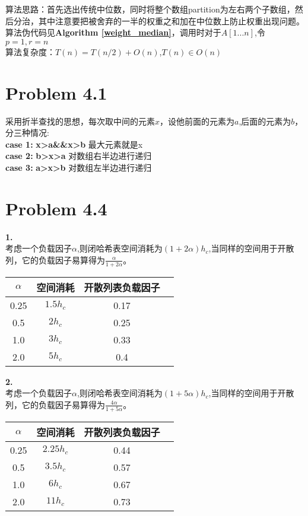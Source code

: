 \documentclass[twocolumn]{ctexart}
\begin{document}
\indent 算法思路：首先选出传统中位数，同时将整个数组partition为左右两个子数组，然后分治，其中注意要把被舍弃的一半的权重之和加在中位数上防止权重出现问题。算法伪代码见\textbf{Algorithm \ref{weight_median}}，调用时对于$A[1...n]$,令$p=1,r=n$\\
\indent 算法复杂度：$T(n)=T(n/2)+O(n)$,$T(n)\in O(n)$\\


\section*{Problem 4.1}
\indent 采用折半查找的思想，每次取中间的元素$x$，设他前面的元素为$a$,后面的元素为$b$，分三种情况:\\
\indent \textbf{case 1:} \textbf{x>a\&\&x>b} 最大元素就是x\\
\indent \textbf{case 2:} \textbf{b>x>a}		对数组右半边进行递归\\
\indent \textbf{case 3:} \textbf{a>x>b}		对数组左半边进行递归

\section*{Problem 4.4}
\noindent \textbf{1.}\\
\indent 考虑一个负载因子$\alpha$,则闭哈希表空间消耗为$(1+2\alpha)h_c$,当同样的空间用于开散列，它的负载因子易算得为$\frac{\alpha}{1+2\alpha}$。\\
\begin{table}[!h]
	\centering
	\begin{tabular}{cccc}
		\toprule
		$\alpha$ &空间消耗& 开散列表负载因子\\
		\midrule
		0.25	&$1.5h_c$	& 	0.17\\		
		0.5		&$2h_c$ 	&	0.25\\
		1.0		&$3h_c$ 	&	0.33\\
		2.0		&$5h_c$ 	&	0.4\\
		\bottomrule
	\end{tabular}
\end{table}

\noindent \textbf{2.}\\
\indent 
考虑一个负载因子$\alpha$,则闭哈希表空间消耗为$(1+5\alpha)h_c$,当同样的空间用于开散列，它的负载因子易算得为$\frac{4\alpha}{1+5\alpha}$。\\
\begin{table}[!h]
	\centering
	\begin{tabular}{cccc}
		\toprule
		$\alpha$ &空间消耗& 开散列表负载因子\\
		\midrule
		0.25	&$2.25h_c$	& 0.44	\\		
		0.5		&$3.5h_c$ 	& 0.57	\\
		1.0		&$6h_c$ 	& 0.67	\\
		2.0		&$11h_c$ 	& 0.73	\\
		\bottomrule
	\end{tabular}
\end{table}
\end{document}
